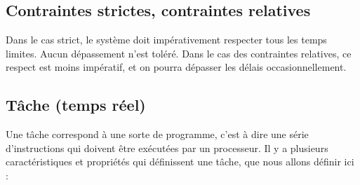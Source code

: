 \documentclass[11pt,a4paper,oneside]{report}
\begin{document}
\subsection{Contraintes strictes, contraintes relatives} 
Dans le cas strict, le système doit impérativement respecter tous les temps limites. Aucun dépassement n'est toléré. Dans le cas des contraintes relatives, ce respect 
est moins impératif, et on pourra dépasser les délais occasionnellement. \\

\subsection{Tâche (temps réel)}
Une tâche correspond à une sorte de programme, c'est à dire une série d'instructions 
qui doivent être exécutées par un processeur. 
Il y a plusieurs caractéristiques 
et propriétés qui définissent une tâche, que nous allons définir ici : 
\end{document}
